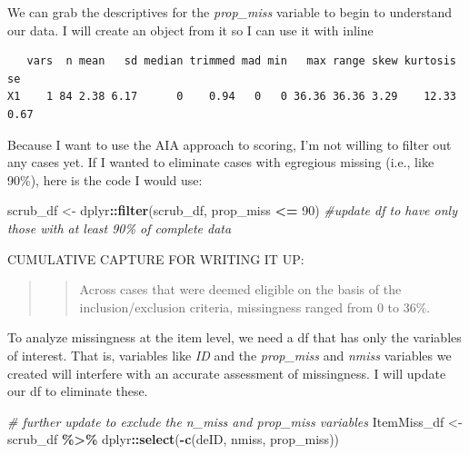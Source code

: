 \documentclass[
  11pt,
]{book}
\newenvironment{Shaded}{\begin{snugshade}}{\end{snugshade}}
\newcommand{\CommentTok}[1]{\textcolor[rgb]{0.37,0.37,0.37}{\textit{#1}}}
\newcommand{\DecValTok}[1]{\textcolor[rgb]{0.06,0.06,0.06}{#1}}
\newcommand{\FunctionTok}[1]{\textcolor[rgb]{0.27,0.27,0.27}{\textbf{#1}}}
\newcommand{\NormalTok}[1]{#1}
\newcommand{\OtherTok}[1]{\textcolor[rgb]{0.37,0.37,0.37}{#1}}
\newcommand{\SpecialCharTok}[1]{\textcolor[rgb]{0.43,0.43,0.43}{\textbf{#1}}}
\begin{document}
We can grab the descriptives for the \emph{prop\_miss} variable to begin to understand our data. I will create an object from it so I can use it with inline

\begin{Shaded}
\end{Shaded}

\begin{verbatim}
   vars  n mean   sd median trimmed mad min   max range skew kurtosis   se
X1    1 84 2.38 6.17      0    0.94   0   0 36.36 36.36 3.29    12.33 0.67
\end{verbatim}

Because I want to use the AIA approach to scoring, I'm not willing to filter out any cases yet. If I wanted to eliminate cases with egregious missing (i.e., like 90\%), here is the code I would use:

\begin{Shaded}
\begin{Highlighting}[]
\NormalTok{scrub\_df }\OtherTok{\textless{}{-}}\NormalTok{ dplyr}\SpecialCharTok{::}\FunctionTok{filter}\NormalTok{(scrub\_df, prop\_miss }\SpecialCharTok{\textless{}=} \DecValTok{90}\NormalTok{)  }\CommentTok{\#update df to have only those with at least 90\% of complete data}
\end{Highlighting}
\end{Shaded}

CUMULATIVE CAPTURE FOR WRITING IT UP:

\begin{quote}
\begin{quote}
Across cases that were deemed eligible on the basis of the inclusion/exclusion criteria, missingness ranged from 0 to 36\%.
\end{quote}
\end{quote}

To analyze missingness at the item level, we need a df that has only the variables of interest. That is, variables like \emph{ID} and the \emph{prop\_miss} and \emph{nmiss} variables we created will interfere with an accurate assessment of missingness. I will update our df to eliminate these.

\begin{Shaded}
\begin{Highlighting}[]
\CommentTok{\# further update to exclude the n\_miss and prop\_miss variables}
\NormalTok{ItemMiss\_df }\OtherTok{\textless{}{-}}\NormalTok{ scrub\_df }\SpecialCharTok{\%\textgreater{}\%}
\NormalTok{    dplyr}\SpecialCharTok{::}\FunctionTok{select}\NormalTok{(}\SpecialCharTok{{-}}\FunctionTok{c}\NormalTok{(deID, nmiss, prop\_miss))}
\end{Highlighting}
\end{Shaded}
\end{document}
